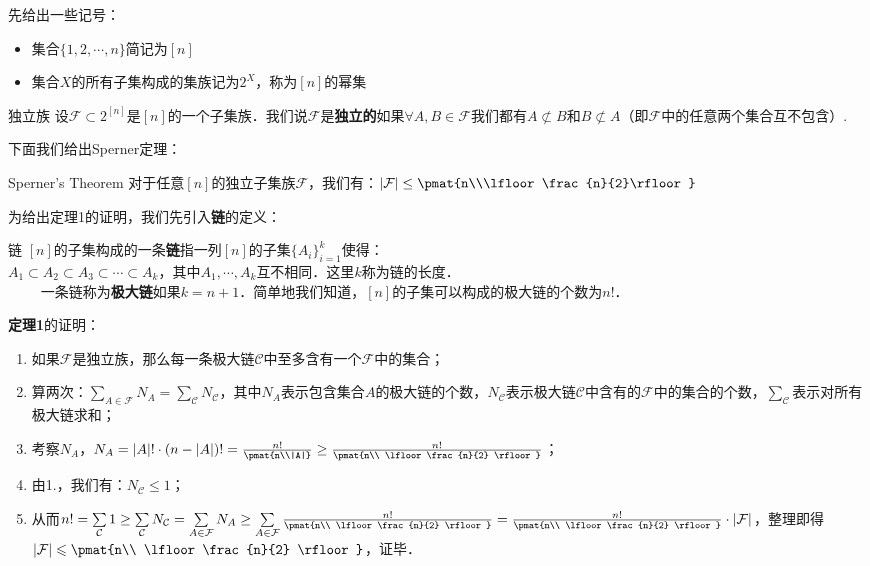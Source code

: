 
先给出一些记号：
\begin{itemize}
\item 集合$\{1,2,\cdots,n\}$简记为$[n]$
\item 集合$X$的所有子集构成的集族记为$2^{X}$，称为$[n]$的幂集
\end{itemize}

\begin{definition}{独立族}
设$\mathcal{F}\subset 2^{[n]}$是$[n]$的一个子集族．我们说$\mathcal{F}$是\textbf{独立的}如果$\forall A,B\in \mathcal{F}$我们都有$A\not\subset B$和$B\not\subset A$（即$\mathcal{F}$中的任意两个集合互不包含）.
\end{definition}

下面我们给出Sperner定理：
\begin{theorem}{Sperner's Theorem}
对于任意$[n]$的独立子集族$\mathcal{F}$，我们有：$|\mathcal{F}|\leq \pmat{n\\\lfloor \frac{n}{2}\rfloor}$

\end{theorem}
为给出定理1的证明，我们先引入\textbf{链}的定义：
\begin{definition}{链}
$[n]$的子集构成的一条\textbf{链}指一列$[n]$的子集$\{A_i\}_{i=1}^{k}$使得：\\
$A_1\subset A_2\subset A_3\subset \cdots \subset A_k$，其中$A_1,\cdots,A_k$互不相同．这里$k$称为链的长度．\\
$\qquad$
一条链称为\textbf{极大链}如果$k=n+1$．简单地我们知道，$[n]$的子集可以构成的极大链的个数为$n!$．
\end{definition}

\textbf{定理1}的证明：\\
\begin{enumerate}
\item 如果$\mathcal{F}$是独立族，那么每一条极大链$\mathcal{C}$中至多含有一个$\mathcal{F}$中的集合；
\item 算两次：$\sum\limits_{A\in \mathcal{F}}N_A=\sum\limits_{\mathcal{C}}N_{\mathcal{C}}$，其中$N_A$表示包含集合$A$的极大链的个数，$N_{\mathcal{C}}$表示极大链$\mathcal{C}$中含有的$\mathcal{F}$中的集合的个数，$\sum\limits_{\mathcal{C}}$表示对所有极大链求和；
\item 考察$N_A$，$N_A=|A|!\cdot (n-|A|)!=\frac{n!}{\pmat{n\\|A|}}\geq \frac{n!}{\pmat{n\\ \lfloor\frac{n}{2} \rfloor}}$；
\item 由1.，我们有：$N_{\mathcal{C}}\leq 1$；
\item 从而$n!=\sum\limits_{\mathcal{C}}1\geq \sum\limits_{\mathcal{C}}N_{\mathcal{C}}=\sum\limits_{A\in \mathcal{F}}N_A\geq \sum\limits_{A\in \mathcal{F}}\frac{n!}{\pmat{n\\ \lfloor\frac{n}{2} \rfloor}}=\frac{n!}{\pmat{n\\ \lfloor\frac{n}{2} \rfloor}}\cdot |\mathcal{F}|$，整理即得$|\mathcal{F}|\leqslant\pmat{n\\ \lfloor\frac{n}{2} \rfloor}$，证毕．
\end{enumerate}

